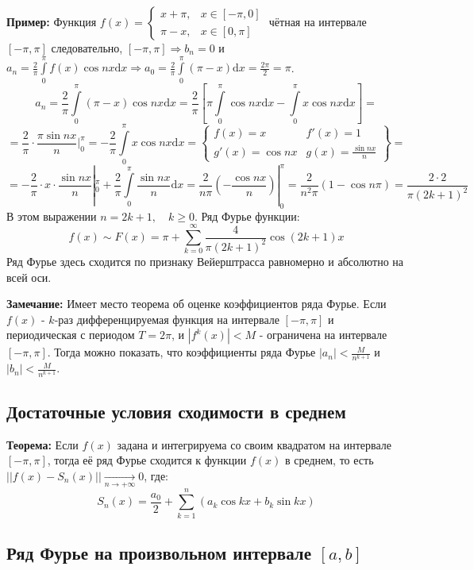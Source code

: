 \documentclass[12pt, a4paper]{article}
\newcommand{\di}{\mathrm{d}}
\begin{document}
\textbf{Пример:} Функция $f(x) = \begin{cases} x+\pi, & x \in [-\pi, 0] \\ \pi - x, & x \in [0, \pi] \end{cases}$ чётная на интервале $[-\pi, \pi]$ следовательно, $[-\pi, \pi] \Rightarrow b_n=0$ и $a_n = \frac{2}{\pi} \int \limits_0^{\pi} f(x) \cos nx \di x \Rightarrow a_0 = \frac{2}{\pi} \int \limits_0^{\pi} (\pi - x) \di x = \frac{2\pi}{2} = \pi$.
\[a_n = \frac{2}{\pi} \int \limits_0^{\pi} (\pi - x) \cos nx \di x = \frac{2}{\pi} \left[ \pi \int \limits_0^{\pi} \cos nx \di x - \int \limits_0^{\pi} x \cos nx \di x \right] = \]
\[= \frac{2}{\pi} \cdot \frac{\pi \sin nx}{n} |^{\pi}_0 = -\frac{2}{\pi} \int \limits^{\pi}_0 x \cos nx \di x = \begin{Bmatrix} f(x) = x & f'(x) = 1 \\ g'(x) = \cos nx & g(x) = \tfrac{\sin nx}{n} \end{Bmatrix} = \]
\[= -\frac{2}{\pi} \cdot x \cdot \frac{\sin nx}{n} |^{\pi}_0 + \frac{2}{\pi} \int \limits_0^{\pi} \frac{\sin nx}{n} \di x = \frac{2}{n\pi} \left( -\frac{\cos nx}{n} \right) |_0^{\pi} = \frac{2}{n^2\pi} (1-\cos n\pi) = \frac{2 \cdot 2}{\pi (2k+1)^2} \]
В этом выражении $n = 2k+1, \quad k \geq 0$. Ряд Фурье функции:
\[f(x) \sim F(x) = \pi + \sum_{k=0}^{\infty} \frac{4}{\pi (2k+1)^2} \cos (2k+1)x \]
Ряд Фурье здесь сходится по признаку Вейерштрасса равномерно и абсолютно на всей оси.

\textbf{Замечание:} Имеет место теорема об оценке коэффициентов ряда Фурье. Если $f(x)$ - $k$-раз дифференцируемая функция на интервале $[-\pi, \pi]$ и периодическая с периодом $T=2\pi$, и $|f^k(x)|<M$ - ограничена на интервале $[-\pi, \pi]$. Тогда можно показать, что коэффициенты ряда Фурье $|a_n| < \frac{M}{n^{k+1}}$ и $|b_n| < \frac{M}{n^{k+1}}$.

\subsection{Достаточные условия сходимости в среднем}

\textbf{Теорема:} Если $f(x)$ задана и интегрируема со своим квадратом на интервале $[-\pi, \pi]$, тогда её ряд Фурье сходится к функции $f(x)$ в среднем, то есть $||f(x) - S_n(x)|| \xrightarrow[n \to +\infty]{} 0$, где:
\[S_n(x) = \frac{a_0}{2} + \sum_{k=1}^{n} (a_k \cos kx + b_k \sin kx) \]

\subsection{Ряд Фурье на произвольном интервале $[a, b]$}
\end{document}
